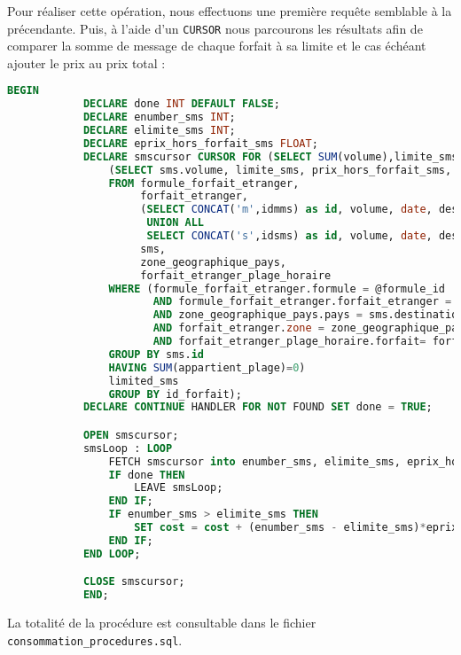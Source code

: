Pour réaliser cette opération, nous effectuons une première requête semblable à la précendante. Puis, à l'aide d'un \texttt{CURSOR} nous parcourons les résultats afin de comparer la somme de message de chaque forfait à sa limite et le cas échéant ajouter le prix au prix total :


\begin{lstlisting}[language=sql]
 BEGIN
            DECLARE done INT DEFAULT FALSE;
            DECLARE enumber_sms INT;
            DECLARE elimite_sms INT;
            DECLARE eprix_hors_forfait_sms FLOAT;
            DECLARE smscursor CURSOR FOR (SELECT SUM(volume),limite_sms, prix_hors_forfait_sms FROM
                (SELECT sms.volume, limite_sms, prix_hors_forfait_sms, isInPlageHoraire(sms.date, forfait_etranger_plage_horaire.plage) AS appartient_plage, forfait_etranger.id as id_forfait
                FROM formule_forfait_etranger,
                     forfait_etranger,
                     (SELECT CONCAT('m',idmms) as id, volume, date, destination FROM mms WHERE consommation=consoId
                      UNION ALL
                      SELECT CONCAT('s',idsms) as id, volume, date, destination FROM sms WHERE consommation=consoId)
                     sms,
                     zone_geographique_pays,
                     forfait_etranger_plage_horaire
                WHERE (formule_forfait_etranger.formule = @formule_id
                       AND formule_forfait_etranger.forfait_etranger = forfait_etranger.id
                       AND zone_geographique_pays.pays = sms.destination
                       AND forfait_etranger.zone = zone_geographique_pays.zone_geographique
                       AND forfait_etranger_plage_horaire.forfait= forfait_etranger.id)
                GROUP BY sms.id
                HAVING SUM(appartient_plage)=0)
                limited_sms
                GROUP BY id_forfait);
            DECLARE CONTINUE HANDLER FOR NOT FOUND SET done = TRUE;

            OPEN smscursor;
            smsLoop : LOOP
                FETCH smscursor into enumber_sms, elimite_sms, eprix_hors_forfait_sms;
                IF done THEN
                    LEAVE smsLoop;
                END IF;
                IF enumber_sms > elimite_sms THEN
                    SET cost = cost + (enumber_sms - elimite_sms)*eprix_hors_forfait_sms;
                END IF;
            END LOOP;

            CLOSE smscursor;
            END;
\end{lstlisting}

La totalité de la procédure est consultable dans le fichier \texttt{consommation_procedures.sql}.
